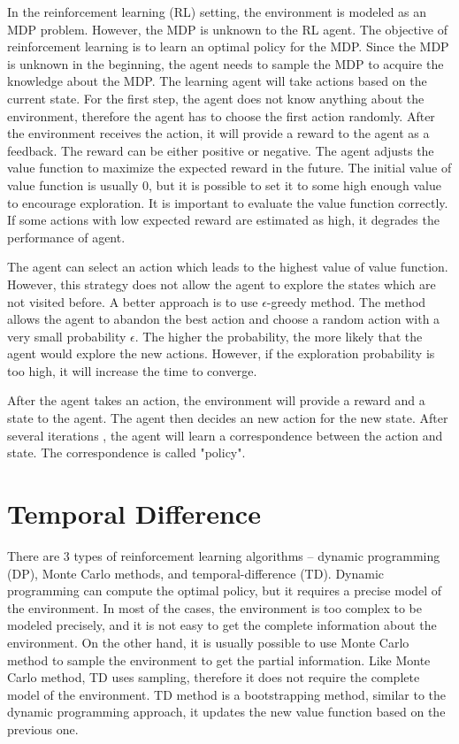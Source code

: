 
In the reinforcement learning (RL) setting, the environment is modeled as an MDP problem.
However, the MDP is unknown to the RL agent. The objective of reinforcement learning is to 
learn an optimal policy for the MDP. Since the MDP is unknown in the beginning, 
the agent needs to sample the MDP to acquire the knowledge about the MDP.
The learning agent will take actions based on the current state. For the first step, the agent does not know anything about 
the environment, therefore the agent has to choose the first action randomly. After the environment
receives the action, it will provide a reward to the agent as a feedback. The reward can be either
positive or negative. The agent adjusts the value function to maximize the expected reward in the future.
The initial value of value function is 
usually 0, but it is possible to set it to some high enough value to encourage exploration.
It is important to evaluate the value function 
correctly. If some actions with low expected reward are estimated as high, it degrades the
performance of agent.

The agent can select an action which leads to the highest value of value function. However, 
this strategy does not allow the agent to explore the states which are not visited before.
A better approach is to use $\epsilon$-greedy method. The method allows the agent to abandon the
best action and choose
a random action with a very small probability $\epsilon$. The higher the probability, the more
likely that the agent would explore the new actions. However, if the exploration probability 
is too high, it will increase the time to converge.

After the agent takes an action, the environment will provide a reward and a state to the
agent. The agent then decides an new action for the new state. After several iterations
, the agent will learn a correspondence between the action and state. The correspondence is called 
"policy". 

\section{Temporal Difference}
\label{sec:TD}
There are 3 types of reinforcement learning algorithms -- dynamic programming (DP), Monte Carlo 
methods, and temporal-difference (TD). Dynamic programming can compute the optimal policy, but it 
requires a precise model of the environment. In most of the cases, the environment
is too complex to be modeled precisely, and it is not easy to get the complete information about
the environment. On the other hand, it is usually possible to use Monte Carlo method to sample the environment to
get the partial information. 
Like Monte Carlo method, TD uses sampling, therefore it does not require the 
complete model of the environment. TD method is a bootstrapping method, similar to the dynamic 
programming approach, it updates the new value function based on the previous one.

